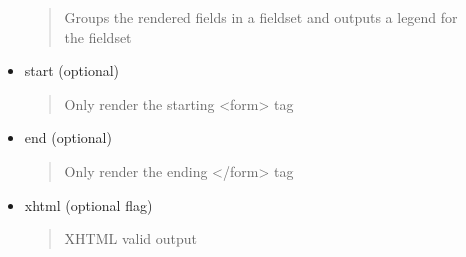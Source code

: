 \documentclass[letterpaper,10pt,english]{sphinxmanual}
\begin{document}
\begin{fulllineitems}
\begin{fulllineitems}
\begin{description}
\begin{itemize}
\begin{quote}
Groups the rendered fields in a fieldset and outputs a legend for the fieldset
\end{quote}

\item {} 
start (optional)
\begin{quote}

Only render the starting \textless{}form\textgreater{} tag
\end{quote}

\item {} 
end (optional)
\begin{quote}

Only render the ending \textless{}/form\textgreater{} tag
\end{quote}

\item {} 
xhtml (optional flag)
\begin{quote}

XHTML valid output
\end{quote}

\end{itemize}

\end{description}

\end{fulllineitems}


\begin{fulllineitems}
\label{knop_form:knop_form.renderformend}
\end{fulllineitems}


\begin{fulllineitems}
\label{knop_form:knop_form.renderformstart}
\end{fulllineitems}


\begin{fulllineitems}
\label{knop_form:knop_form.renderhtml}
\end{fulllineitems}


\end{fulllineitems}
\end{document}
